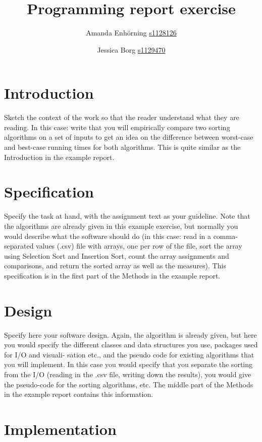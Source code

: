\documentclass[a4paper,10pt,oneside]{article}
\title{Programming report exercise}
\author{Amanda Enhörning \url{s1128126} \and Jessica Borg \url{s1129470}}
\begin{document}
\maketitle

\section{Introduction}

Sketch the context of the work so that the reader understand what they are reading. In this
case: write that you will empirically compare two sorting algorithms on a set of inputs to get
an idea on the difference between worst-case and best-case running times for both algorithms.
This is quite similar as the Introduction in the example report.

\section{Specification}

Specify the task at hand, with the assignment text as your guideline. Note that the algorithms
are already given in this example exercise, but normally you would describe what the software
should do (in this case: read in a comma-separated values (.csv) file with arrays, one per row
of the file, sort the array using Selection Sort and Insertion Sort, count the array assignments
and comparisons, and return the sorted array as well as the measures). This specification is
in the first part of the Methods in the example report.

\section{Design}

Specify here your software design. Again, the algorithm is already given, but here you would
specify the different classes and data structures you use, packages used for I/O and visuali-
sation etc., and the pseudo code for existing algorithms that you will implement. In this case
you would specify that you separate the sorting from the I/O (reading in the .csv file, writing
down the results), you would give the pseudo-code for the sorting algorithms, etc. The middle
part of the Methods in the example report contains this information.

\section{Implementation}
\end{document}
